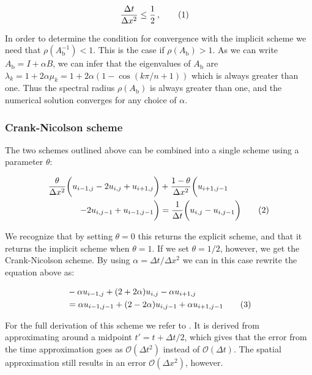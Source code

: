 \documentclass[reprint,english,notitlepage]{revtex4-1}  %
\newcommand\numberthis{\addtocounter{equation}{1}\tag{\theequation}}
\begin{document}
\begin{align*}
\frac{\Delta t}{\Delta x^2} &\leq \frac{1}{2} \, , \numberthis \label{eq:forward_euler_convergence}
\end{align*}

In order to determine the condition for convergence with the implicit scheme we need that $\rho(A_\text{b}^{-1}) < 1$. This is the case if $\rho(A_\text{b}) > 1$. As we can write $A_\text{b} = I + \alpha B$, we can infer that the eigenvalues of $A_\text{b}$ are $\lambda_k = 1 + 2\alpha \mu_k = 1 + 2\alpha (1 - \cos(k\pi/n + 1) )$ which is always greater than one. Thus the spectral radius $\rho(A_\text{b})$ is always greater than one, and the numerical solution converges for any choice of $\alpha$. 


\subsubsection{Crank-Nicolson scheme} \label{sec:formalism_crank_nicolson}

The two schemes outlined above can be combined into a single scheme using a parameter $\theta$:

\begin{align*}
\frac{\theta}{\Delta x^2} \bigg( u_{i-1,j} - 2u_{i,j} + u_{i+1,j} \bigg) &+ \frac{1 - \theta}{\Delta x^2} \bigg( u_{i+1,j-1} \\
- 2u_{i,j-1} + u_{i-1,j-1} \bigg) &= \frac{1}{\Delta t} \bigg( u_{i,j} - u_{i,j-1} \bigg) \numberthis \label{eq:theta_rule}
\end{align*}

We recognize that by setting $\theta=0$ this returns the explicit scheme, and that it returns the implicit scheme when $\theta = 1$. If we set $\theta = 1/2$, however, we get the Crank-Nicolson scheme. By using $\alpha = \Delta t / \Delta x^2$ we can in this case rewrite the equation above as:

\begin{align*}
&-\alpha u_{i-1,j} + (2 + 2 \alpha) u_{i,j} - \alpha u_{i+1,j} \\
&= \alpha u_{i-1,j-1} + (2-2\alpha) u_{i,j-1} + \alpha u_{i+1,j-1} \numberthis \label{eq:crank_nicolson}
\end{align*}

For the full derivation of this scheme we refer to \cite[p.~311]{Hjorth-Jensen2015}. It is derived from approximating around a midpoint $t' = t + \Delta t/2$, which gives that the error from the time approximation goes as $\mathcal{O}(\Delta t^2)$ instead of $\mathcal{O}(\Delta t)$. The spatial approximation still results in an error $\mathcal{O}(\Delta x^2)$, however.
\end{document}
